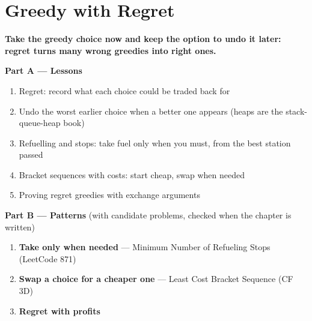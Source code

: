 \chapter{Greedy with Regret}
\label{ch:regret}

\begin{tcolorbox}[enhanced, colback=white, colframe=secondaryblue, boxrule=1pt, arc=2mm]
\textbf{\large\textcolor{primaryblue}{Take the greedy choice now and keep the option to undo it later: regret turns many wrong greedies into right ones.}}
\end{tcolorbox}


\begin{plannedbox}
\textbf{Part A --- Lessons}
\begin{enumerate}[leftmargin=*, label=\textbf{A\arabic*.}, itemsep=1pt]
    \item Regret: record what each choice could be traded back for
    \item Undo the worst earlier choice when a better one appears (heaps are the stack-queue-heap book)
    \item Refuelling and stops: take fuel only when you must, from the best station passed
    \item Bracket sequences with costs: start cheap, swap when needed
    \item Proving regret greedies with exchange arguments
\end{enumerate}
\textbf{Part B --- Patterns} (with candidate problems, checked when the chapter is written)
\begin{enumerate}[leftmargin=*, label=\textbf{P\arabic*.}, itemsep=1pt]
    \item \textbf{Take only when needed} --- Minimum Number of Refueling Stops {\small\color{darkgray}(LeetCode 871)}
    \item \textbf{Swap a choice for a cheaper one} --- Least Cost Bracket Sequence {\small\color{darkgray}(CF 3D)}
    \item \textbf{Regret with profits}
\end{enumerate}
\end{plannedbox}
